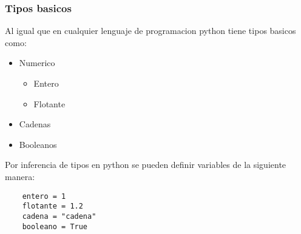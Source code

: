 \begin{frame}[fragile]
    \frametitle{Tipos basicos}

    Al igual que en cualquier lenguaje de programacion python tiene
    tipos basicos como:

    \begin{itemize}
        \item Numerico
            \begin{itemize}
                \item Entero
                \item Flotante
            \end{itemize}
        \item Cadenas
        \item Booleanos
    \end{itemize}

    Por inferencia de tipos en python se pueden definir variables de la
    siguiente manera:

    \begin{lstlisting}
    entero = 1
    flotante = 1.2
    cadena = "cadena"
    booleano = True
    \end{lstlisting}

\end{frame}
